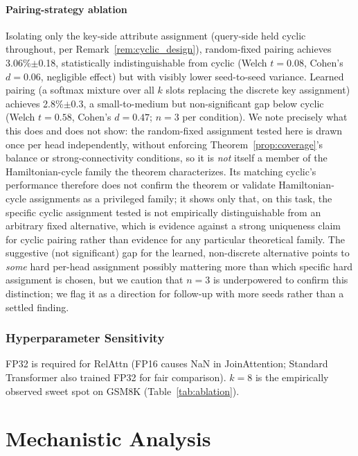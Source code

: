 \documentclass[review]{elsarticle}
\begin{document}
\paragraph{Pairing-strategy ablation} Isolating only the key-side attribute assignment (query-side held cyclic throughout, per Remark~\ref{rem:cyclic_design}), random-fixed pairing achieves 3.06\%$\pm$0.18, statistically indistinguishable from cyclic (Welch $t{=}0.08$, Cohen's $d{=}0.06$, negligible effect) but with visibly lower seed-to-seed variance. Learned pairing (a softmax mixture over all $k$ slots replacing the discrete key assignment) achieves 2.8\%$\pm$0.3, a small-to-medium but non-significant gap below cyclic (Welch $t{=}0.58$, Cohen's $d{=}0.47$; $n{=}3$ per condition). We note precisely what this does and does not show: the random-fixed assignment tested here is drawn once per head independently, without enforcing Theorem~\ref{prop:coverage}'s balance or strong-connectivity conditions, so it is \emph{not} itself a member of the Hamiltonian-cycle family the theorem characterizes. Its matching cyclic's performance therefore does not confirm the theorem or validate Hamiltonian-cycle assignments as a privileged family; it shows only that, on this task, the specific cyclic assignment tested is not empirically distinguishable from an arbitrary fixed alternative, which is evidence against a strong uniqueness claim for cyclic pairing rather than evidence for any particular theoretical family. The suggestive (not significant) gap for the learned, non-discrete alternative points to \emph{some} hard per-head assignment possibly mattering more than which specific hard assignment is chosen, but we caution that $n{=}3$ is underpowered to confirm this distinction; we flag it as a direction for follow-up with more seeds rather than a settled finding.

\subsubsection{Hyperparameter Sensitivity}

FP32 is required for RelAttn (FP16 causes NaN in JoinAttention; Standard Transformer also trained FP32 for fair comparison). $k{=}8$ is the empirically observed sweet spot on GSM8K (Table~\ref{tab:ablation}).

\section{Mechanistic Analysis}
\label{sec:analysis}
\end{document}
